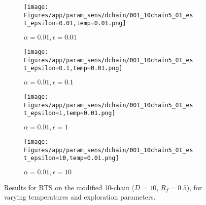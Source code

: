 \documentclass{article}
\theoremstyle{plain}
\begin{document}
\begin{appendices}
\begin{figure}
                \begin{subfigure}[b]{0.24\textwidth}
                    \centering
                    \texttt{[image: Figures/app/param\_sens/dchain/001\_10chain5\_01\_est\_epsilon=0.01,temp=0.01.png]}
                    \caption*{$\alpha=0.01,\epsilon=0.01$}
                \end{subfigure}
                \begin{subfigure}[b]{0.24\textwidth}
                    \centering
                    \texttt{[image: Figures/app/param\_sens/dchain/001\_10chain5\_01\_est\_epsilon=0.1,temp=0.01.png]}
                    \caption*{$\alpha=0.01,\epsilon=0.1$}
                \end{subfigure}
                \begin{subfigure}[b]{0.24\textwidth}
                    \centering
                    \texttt{[image: Figures/app/param\_sens/dchain/001\_10chain5\_01\_est\_epsilon=1,temp=0.01.png]}
                    \caption*{$\alpha=0.01,\epsilon=1$}
                \end{subfigure}
                \begin{subfigure}[b]{0.24\textwidth}
                    \centering
                    \texttt{[image: Figures/app/param\_sens/dchain/001\_10chain5\_01\_est\_epsilon=10,temp=0.01.png]}
                    \caption*{$\alpha=0.01,\epsilon=10$}
                \end{subfigure}
                
                \caption{Results for BTS on the modified 10-chain ($D=10$, $R_f=0.5$), for varying temperatures and exploration parameters.}
                \label{fig:bts_10chain_half_hps}
            \end{figure}


            \begin{figure}
                \centering
                

\end{figure}
\end{appendices}
\end{document}
